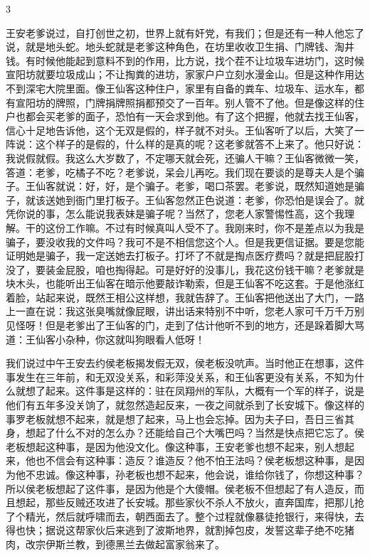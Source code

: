 3 

王安老爹说过，自打创世之初，世界上就有奸党，有我们；但是还有一种人他忘了说，就是地头蛇。地头蛇就是老爹这种角色，在坊里收收卫生捐、门牌钱、淘井钱。有时候他能起到意料不到的作用，比方说，找个茬不让垃圾车进坊门，这时候宣阳坊就要垃圾成山；不让掏粪的进坊，家家户户立刻水漫金山。但是这种作用达不到深宅大院里面。像王仙客这种住户，家里有自备的粪车、垃圾车、运水车，都有宣阳坊的牌照，门牌捐牌照捐都预交了一百年。别人管不了他。但是像这样的住户也都会买老爹的面子，恐怕有一天会求到他。有了这个把握，他就去找王仙客，信心十足地告诉他，这个无双是假的，样子就不对头。王仙客听了以后，大笑了一阵说：这个样子的是假的，什么样的是真的呢？这老爹就答不上来了。他只好说：我说假就假。我这么大岁数了，不定哪天就会死，还骗人干嘛？王仙客微微一笑，答道：老爹，吃橘子不吃？老爹说，呆会儿再吃。我们现在要谈的是尊夫人是个骗子。王仙客就说：好，好，是个骗子。老爹，喝口茶罢。老爹说，既然知道她是骗子，就该送她到衙门里打板子。王仙客忽然正色说道：老爹，你恐怕是误会了。就凭你说的事，怎么能说我表妹是骗子呢？当然了，您老人家警惕性高，这个我理解。干的这份工作嘛。不过有时候真叫人受不了。我刚来时，你不是差点以为我是骗子，要没收我的文件吗？我可不是不相信您这个人。但是我更信证据。要是您能证明她是骗子，我一定送她去打板子。打坏了不就是掏点医疗费吗？就是把屁股打没了，要装金屁股，咱也掏得起。可是好好的没事儿，我花这份钱干嘛？老爹就是块木头，也能听出王仙客在暗示他要敲诈勒索，但是王仙客不吃这套。于是他涨红着脸，站起来说，既然王相公这样想，我就告辞了。王仙客把他送出了大门，一路上一直在说：我这张臭嘴就像屁眼，讲出话来特别不中听，您老人家可千万千万别见怪呀！但是老爹出了王仙客的门，走到了估计他听不到的地方，还是跺着脚大骂道：王仙客小杂种，你这就叫狗眼看人低呀！ 

我们说过中午王安去约侯老板揭发假无双，侯老板没吭声。当时他正在想事，这件事发生在三年前，和无双没关系，和彩萍没关系，和王仙客更没有关系，不知为什么就想了起来。这件事是这样的：驻在凤翔州的军队，大概有一个军的样子，说是他们有五年多没关饷了，就忽然造起反来，一夜之间就杀到了长安城下。像这样的事罗老板就想不起来，就是想了起来，马上也会忘掉。因为夫子曰，吾日三省其身，想起了什么不对的怎么办？还能给自己个大嘴巴吗？当然是快点把它忘了。侯老板想起这种事，是因为他没文化。像这种事，王安老爹也想不起来，别人想起来，他也不信会有这种事：造反？谁造反？他不怕王法吗？侯老板想这种事，是因为他不忠诚。像这种事，孙老板也想不起来，他会说，谁给你钱了，你想这种事？所以侯老板想起了这件事，是因为他是个大傻帽。侯老板不但想起了有人造反，而且想起，那些反贼还攻进了长安城。那些家伙不杀人不放火，直奔国库，把那儿抢了个精光，然后就呼啸而去，朝西面去了。整个过程就像暴徒抢银行，来得快，去得也快；据说这帮家伙后来逃到了波斯地界，就割掉包皮，发誓这辈子绝不吃猪肉，改宗伊斯兰教，到德黑兰去做起富家翁来了。 

